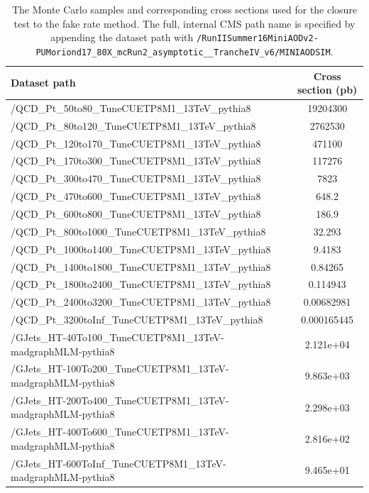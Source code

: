 \begin{table}[!htb]
  \caption{The Monte Carlo samples and corresponding cross sections used for the closure test to the fake rate method. The full, internal CMS path name is specified by appending the dataset path with \texttt{/RunIISummer16MiniAODv2-\allowbreak PUMoriond17\_\allowbreak 80X\_\allowbreak mcRun2\_\allowbreak asymptotic\_\_\allowbreak TrancheIV\_\allowbreak v6/\allowbreak MINIAODSIM}.}
  \label{tab:closure_test_samples}
  \centering
  \vspace{\baselineskip}
  \small %
  \begin{tabular}{lc}
  \hline \hline
  Dataset path & Cross section (pb) \\ 
  \hline
  /QCD\_Pt\_50to80\_TuneCUETP8M1\_13TeV\_pythia8 & 19204300 \\
  /QCD\_Pt\_80to120\_TuneCUETP8M1\_13TeV\_pythia8 & 2762530 \\
  /QCD\_Pt\_120to170\_TuneCUETP8M1\_13TeV\_pythia8 & 471100 \\
  /QCD\_Pt\_170to300\_TuneCUETP8M1\_13TeV\_pythia8 & 117276 \\
  /QCD\_Pt\_300to470\_TuneCUETP8M1\_13TeV\_pythia8 & 7823 \\
  /QCD\_Pt\_470to600\_TuneCUETP8M1\_13TeV\_pythia8 & 648.2 \\
  /QCD\_Pt\_600to800\_TuneCUETP8M1\_13TeV\_pythia8 & 186.9 \\
  /QCD\_Pt\_800to1000\_TuneCUETP8M1\_13TeV\_pythia8 & 32.293 \\
  /QCD\_Pt\_1000to1400\_TuneCUETP8M1\_13TeV\_pythia8 & 9.4183 \\
  /QCD\_Pt\_1400to1800\_TuneCUETP8M1\_13TeV\_pythia8 & 0.84265 \\
  /QCD\_Pt\_1800to2400\_TuneCUETP8M1\_13TeV\_pythia8 & 0.114943 \\
  /QCD\_Pt\_2400to3200\_TuneCUETP8M1\_13TeV\_pythia8 & 0.00682981 \\
  /QCD\_Pt\_3200toInf\_TuneCUETP8M1\_13TeV\_pythia8 & 0.000165445 \\
  \hline
  /GJets\_HT-40To100\_TuneCUETP8M1\_13TeV-madgraphMLM-pythia8 & 2.121e+04 \\
  /GJets\_HT-100To200\_TuneCUETP8M1\_13TeV-madgraphMLM-pythia8 & 9.863e+03 \\
  /GJets\_HT-200To400\_TuneCUETP8M1\_13TeV-madgraphMLM-pythia8 & 2.298e+03 \\
  /GJets\_HT-400To600\_TuneCUETP8M1\_13TeV-madgraphMLM-pythia8 & 2.816e+02 \\ 
  /GJets\_HT-600ToInf\_TuneCUETP8M1\_13TeV-madgraphMLM-pythia8 & 9.465e+01 \\
  \hline \hline
  \end{tabular}
\end{table}

